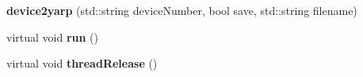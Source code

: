 \begin{DoxyCompactItemize}
\item 
\hypertarget{classdevice2yarp_a2871ae4aafa163197e3991486d3c8b18}{{\bfseries device2yarp} (std\-::string device\-Number, bool save, std\-::string filename)}\label{classdevice2yarp_a2871ae4aafa163197e3991486d3c8b18}

\item 
\hypertarget{classdevice2yarp_aa01eb91fc90a62cb29df3fdc8387cb54}{virtual void {\bfseries run} ()}\label{classdevice2yarp_aa01eb91fc90a62cb29df3fdc8387cb54}

\item 
\hypertarget{classdevice2yarp_ae429ee3f9ab68ceea96daf63553e7700}{virtual void {\bfseries thread\-Release} ()}\label{classdevice2yarp_ae429ee3f9ab68ceea96daf63553e7700}


\end{DoxyCompactItemize}
